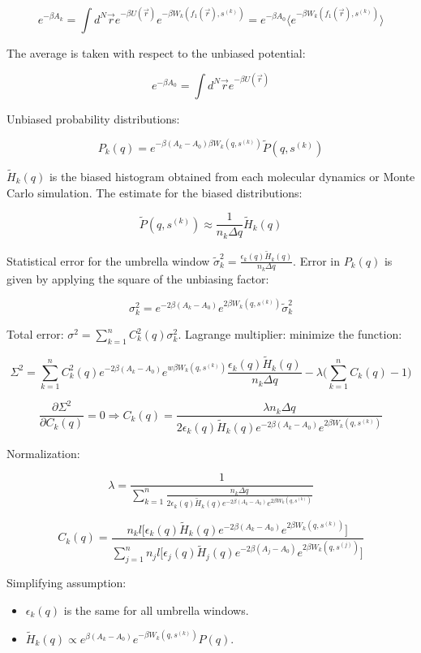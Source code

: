 	$$e^{-\beta A_k} = \int d^N\vec{r}e^{-\beta U(\vec{r})}e^{-\beta W_k(f_1(\vec{r}), s^{(k)})}=e^{-\beta A_0}\biggl\langle e^{-\beta W_k(f_1(\vec{r}), s^{(k)})}\biggr\rangle$$

	The average is taken with respect to the unbiased potential:

	$$e^{-\beta A_0} = \int d^N\vec{r}e^{-\beta U(\vec{r})}$$

	Unbiased probability distributions:

	$$P_k(q) = e^{-\beta(A_k-A_0)\beta W_k(q, s^{(k)})}\tilde{P}(q, s^{(k)})$$

	$\tilde{H}_k(q)$ is the biased histogram obtained from each molecular dynamics or Monte Carlo simulation.
	The estimate for the biased distributions:

	$$\tilde{P}(q, s^{(k)}) \approx\frac{1}{n_k\Delta q}\tilde{H}_k(q)$$

	Statistical error for the umbrella window $\tilde{\sigma}^2_k = \frac{\epsilon_k(q)\tilde{H}_k(q)}{n_k\Delta q}$.
	Error in $P_k(q)$ is given by applying the square of the unbiasing  factor:

	$$\sigma_k^2 = e^{-2\beta(A_k-A_0)}e^{2\beta W_k(q, s^{(k)})}\tilde{\sigma}_k^2$$

	Total error: $\sigma^2 = \sum\limits_{k=1}^nC_k^2(q)\sigma_k^2$.
	Lagrange multiplier: minimize the function:

	$$\Sigma^2=\sum\limits_{k=1}^nC_k^2(q)e^{-2\beta (A_k-A_0)}e^{w\beta W_k(q, s^{(k)})}\frac{\epsilon_k(q)\tilde{H}_k(q)}{n_k\Delta q}-\lambda\biggl(\sum\limits_{k=1}^nC_k(q)-1\biggr)$$

	$$\frac{\partial\Sigma^2}{\partial C_k(q)} = 0\Rightarrow C_k(q) = \frac{\lambda n_k\Delta q}{2\epsilon_k(q)\tilde{H}_k(q)e^{-2\beta(A_k-A_0)}e^{2\beta W_k(q, s^{(k)})}}$$

	Normalization:

	$$\lambda = \frac{1}{\sum\limits_{k=1}^n\frac{n_k\Delta q}{2\epsilon_k(q)\tilde{H}_k(q)e^{-2\beta(A_k-A_0)}e^{2\beta W_k(q, s^{(k)})}}}$$

	$$C_k(q) =\frac{n_kl\bigl[\epsilon_k(q)\tilde{H}_k(q)e^{-2\beta(A_k-A_0)}e^{2\beta W_k(q, s^{(k)})}\bigr]}{\sum\limits_{j=1}^n n_jl\bigl[\epsilon_j(q)\tilde{H}_j(q)e^{-2\beta(A_j-A_0)}e^{2\beta W_k(q, s^{(j)})}\bigr]}$$

	Simplifying assumption:

	\begin{multicols}{2}
		\begin{itemize}
			\item $\epsilon_k(q)$ is the same for all umbrella windows.
			\item $\tilde{H}_k(q)\propto e^{\beta(A_k-A_0)}e^{-\beta W_k(q, s^{(k)})}P(q)$.
		\end{itemize}
	\end{multicols}

